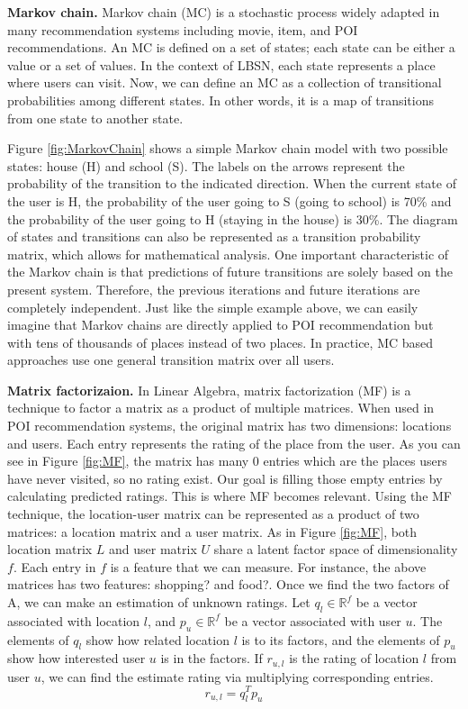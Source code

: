 \documentclass{sig-alternate}
\begin{document}
\textbf{Markov chain.} Markov chain (MC) is a stochastic process widely adapted in many recommendation systems 
including movie, item, and POI recommendations. An MC is defined on a set of states; each state can be either a value
or a set of values. In the context of LBSN, each state represents a place where users can visit.
Now, we can define an MC as a collection of transitional probabilities among different states.
In other words, it is a map of transitions from one state to another state. 

Figure \ref{fig:MarkovChain} shows a simple Markov chain 
model with two possible states: house (H) and school (S). The labels on the arrows represent 
the probability of the transition to the indicated direction. When the current state of the 
user is H, the probability of the user going to S (going to school) is 70\% and the probability of the 
user going to H (staying in the house) is 30\%. The diagram of states and transitions can also be 
represented as a transition probability matrix, which allows for mathematical analysis. One important 
characteristic of the Markov chain is that predictions of future transitions are solely based on the present 
system. Therefore, the previous iterations and future iterations are completely independent. 
Just like the simple example above, we can easily imagine that Markov chains are directly applied to 
POI recommendation but with tens of thousands of places instead of two places. In practice, MC based 
approaches use one general transition matrix over all users. 

\textbf{Matrix factorizaion.} In Linear Algebra, matrix factorization (MF) is a technique to 
factor a matrix as a product of multiple matrices. When used in POI recommendation systems, 
the original matrix has two dimensions: locations and users. Each entry represents the rating of 
the place from the user. As you can see in Figure \ref{fig:MF}, the matrix
has many 0 entries which are the places users have never visited, so no rating exist. 
Our goal is filling those empty entries by calculating predicted ratings. This is where MF becomes
relevant. Using the MF technique, the location-user matrix can be represented as a product of two matrices: 
a location matrix and a user matrix. As in Figure \ref{fig:MF}, both location matrix $L$ and user matrix $U$ share 
a latent factor space of dimensionality $f$. Each entry in $f$ is a feature that we can measure.
For instance, the above matrices has two features: shopping? and food?. Once we find the two 
factors of A, we can make an estimation of unknown ratings. Let $q_l \in \mathbb{R}^f$ be a vector associated with location $l$, and 
$p_u \in \mathbb{R}^f$ be a vector associated with user $u$. The elements of $q_l$ show how related location $l$ is to its factors, 
and the elements of $p_u$ show how interested user $u$ is in the factors. If $r_{u,l}$ is the rating of location $l$ 
from user $u$, we can find the estimate rating via multiplying corresponding entries. ~\cite{Koren:2009}
\begin{equation}
	r_{u,l}= q_l^T p_u
\label{eq:MF}
\end{equation}
\end{document}
